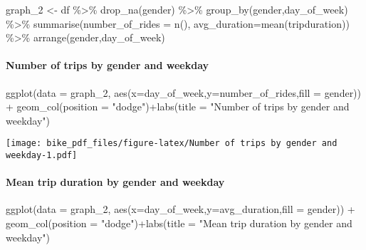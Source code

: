\documentclass[
]{article}
\newenvironment{Shaded}{\begin{snugshade}}{\end{snugshade}}
\newcommand{\AttributeTok}[1]{\textcolor[rgb]{0.77,0.63,0.00}{#1}}
\newcommand{\FunctionTok}[1]{\textcolor[rgb]{0.00,0.00,0.00}{#1}}
\newcommand{\NormalTok}[1]{#1}
\newcommand{\OtherTok}[1]{\textcolor[rgb]{0.56,0.35,0.01}{#1}}
\newcommand{\SpecialCharTok}[1]{\textcolor[rgb]{0.00,0.00,0.00}{#1}}
\newcommand{\StringTok}[1]{\textcolor[rgb]{0.31,0.60,0.02}{#1}}
\begin{document}
\begin{Shaded}
\begin{Highlighting}[]
\NormalTok{graph\_2 }\OtherTok{\textless{}{-}}\NormalTok{ df }\SpecialCharTok{\%\textgreater{}\%}
  \FunctionTok{drop\_na}\NormalTok{(gender) }\SpecialCharTok{\%\textgreater{}\%} 
  \FunctionTok{group\_by}\NormalTok{(gender,day\_of\_week) }\SpecialCharTok{\%\textgreater{}\%} 
  \FunctionTok{summarise}\NormalTok{(}\AttributeTok{number\_of\_rides =} \FunctionTok{n}\NormalTok{(), }\AttributeTok{avg\_duration=}\FunctionTok{mean}\NormalTok{(tripduration)) }\SpecialCharTok{\%\textgreater{}\%} 
  \FunctionTok{arrange}\NormalTok{(gender,day\_of\_week)}
\end{Highlighting}
\end{Shaded}

\hypertarget{number-of-trips-by-gender-and-weekday}{%
\paragraph{Number of trips by gender and
weekday}\label{number-of-trips-by-gender-and-weekday}}

\begin{Shaded}
\begin{Highlighting}[]
\FunctionTok{ggplot}\NormalTok{(}\AttributeTok{data =}\NormalTok{ graph\_2, }\FunctionTok{aes}\NormalTok{(}\AttributeTok{x=}\NormalTok{day\_of\_week,}\AttributeTok{y=}\NormalTok{number\_of\_rides,}\AttributeTok{fill =}\NormalTok{ gender)) }\SpecialCharTok{+}
  \FunctionTok{geom\_col}\NormalTok{(}\AttributeTok{position =} \StringTok{"dodge"}\NormalTok{)}\SpecialCharTok{+}\FunctionTok{labs}\NormalTok{(}\AttributeTok{title =} \StringTok{"Number of trips by gender and weekday"}\NormalTok{)}
\end{Highlighting}
\end{Shaded}

\texttt{[image: bike\_pdf\_files/figure-latex/Number of trips by gender and weekday-1.pdf]}

\hypertarget{mean-trip-duration-by-gender-and-weekday}{%
\paragraph{Mean trip duration by gender and
weekday}\label{mean-trip-duration-by-gender-and-weekday}}

\begin{Shaded}
\begin{Highlighting}[]
\FunctionTok{ggplot}\NormalTok{(}\AttributeTok{data =}\NormalTok{ graph\_2, }\FunctionTok{aes}\NormalTok{(}\AttributeTok{x=}\NormalTok{day\_of\_week,}\AttributeTok{y=}\NormalTok{avg\_duration,}\AttributeTok{fill =}\NormalTok{ gender)) }\SpecialCharTok{+}
  \FunctionTok{geom\_col}\NormalTok{(}\AttributeTok{position =} \StringTok{"dodge"}\NormalTok{)}\SpecialCharTok{+}\FunctionTok{labs}\NormalTok{(}\AttributeTok{title =} \StringTok{"Mean trip duration by gender and weekday"}\NormalTok{)}
\end{Highlighting}
\end{Shaded}
\end{document}
